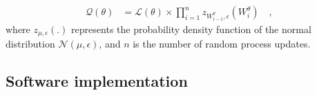 \begin{equation}
    \label{eq:acc_qtt}
    \begin{split}
    \mathcal{Q}(\theta) & = \mathcal{L}(\theta) \times \prod_{i=1}^{n} z_{W^\theta_{i-1},\epsilon}(W^\theta_i) \quad ,
    \end{split}
\end{equation}
where $z_{\mu,\epsilon}(.)$ represents the probability density function of the normal distribution $\mathcal{N}(\mu, \epsilon)$, and $n$ is the number 
of random process updates.

\subsection{Software implementation}

